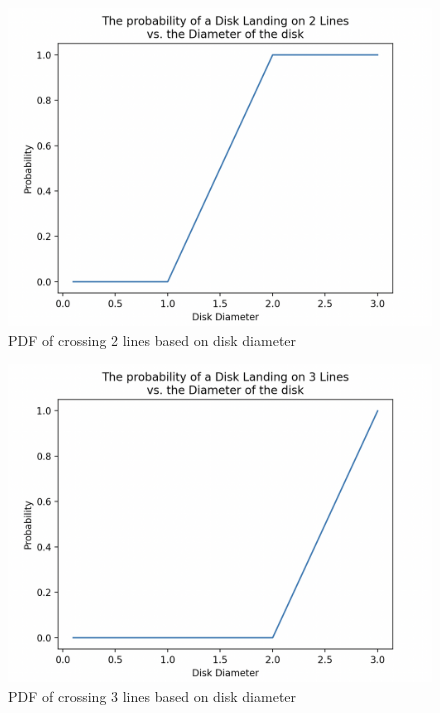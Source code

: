 \documentclass{article}
\begin{document}
\begin{figure}[hbt!]
    \centering
    \includegraphics[width=0.95\linewidth]{images/l2.png}
    \caption{PDF of crossing 2 lines based on disk diameter}
    \label{fig:l2}
\end{figure}
\begin{figure}[hbt!]
    \centering
    \includegraphics[width=0.95\linewidth]{images/l3.png}
    \caption{PDF of crossing 3 lines based on disk diameter}
    \label{fig:l3}
\end{figure}
\end{document}
